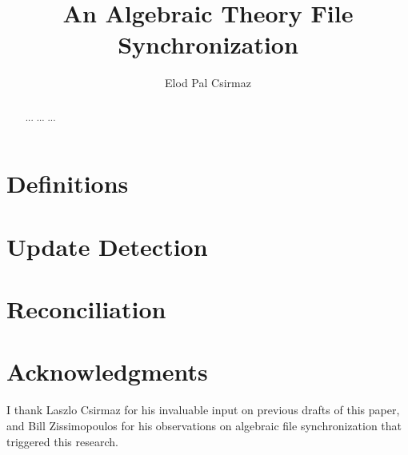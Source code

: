 \documentclass[12pt]{article}
\title{An Algebraic Theory File Synchronization}
\author{Elod Pal Csirmaz}
\begin{document}
\maketitle
\begin{abstract}
... ... ...
\end{abstract}







\section{Definitions}\label{sec_def}











\section{Update Detection}\label{sec_update}









\section{Reconciliation}\label{sec_rec}





















\section{Acknowledgments}

I thank Laszlo Csirmaz for his invaluable input on previous drafts of this paper,
and Bill Zissimopoulos for his observations on algebraic file synchronization that triggered this research.


\begin{thebibliography}{99}



\end{thebibliography}
\end{document}
